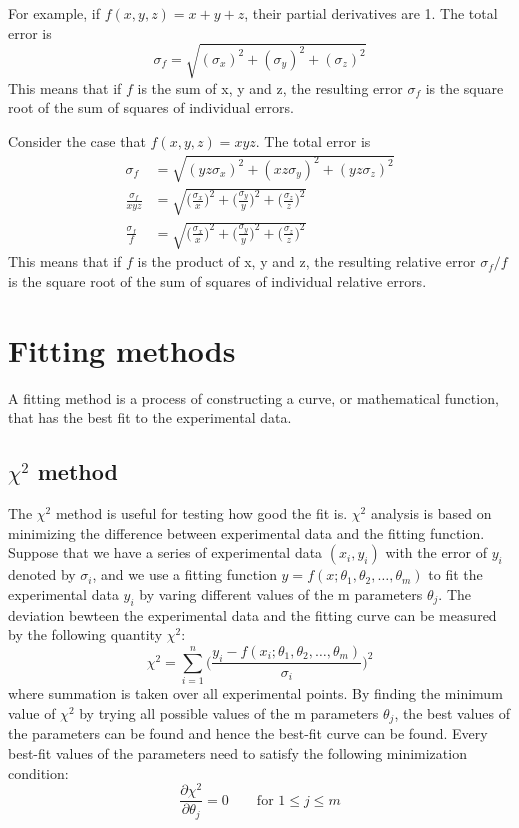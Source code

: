 \documentclass[12pt,a4paper]{report}
\begin{document}
For example, if $f(x,y,z) = x+y+z$, their partial derivatives are 1. The total error is
\begin{equation}
\sigma_{f} = \sqrt{( \sigma_x )^2 + ( \sigma_y )^2+ ( \sigma_z )^2}
\end{equation}
 This means that if $f$ is the sum of x, y and z, the resulting error $\sigma_{f}$ is the square root of the sum of squares of individual errors.
 
Consider the case that $f(x,y,z) = xyz$. The total error is
\begin{align}
\sigma_{f} &= \sqrt{( yz \sigma_x )^2 + ( xz \sigma_y )^2+ ( yz \sigma_z )^2} \\
\frac{ \sigma_{f} }{xyz} &= \sqrt{ \Big( \frac{\sigma_x}{x} \Big)^2 + \Big( \frac{\sigma_y}{y} \Big)^2 + \Big( \frac{\sigma_z}{z} \Big)^2} \\
\frac{ \sigma_{f} }{f} &= \sqrt{ \Big( \frac{\sigma_x}{x} \Big)^2 + \Big( \frac{\sigma_y}{y} \Big)^2 + \Big( \frac{\sigma_z}{z} \Big)^2}
\end{align}
This means that if $f$ is the product of x, y and z, the resulting relative error $\sigma_{f}/f$ is the square root of the sum of squares of individual relative errors.

\section{Fitting methods}
A fitting method is a process of constructing a curve, or mathematical function, that has the best fit to the experimental data.
\subsection{$\chi^2$ method}
The $\chi^2$ method is useful for testing how good the fit is.
$\chi^2$ analysis \cite{stat_2, BAKER1984437, reduced_chi_squared} is based on minimizing the difference between experimental data and the fitting function. Suppose that we have a series of experimental data $(x_i,y_i)$ with the error of $y_i$ denoted by $\sigma_i$, and we use a fitting function $y = f(x;\theta_1,\theta_2,\dots,\theta_m)$ to fit the experimental data $y_i$ by varing different values of the m parameters $\theta_j$. The deviation bewteen the experimental data and the fitting curve can be measured by the following quantity $\chi^2$:
\begin{equation} \label{chi_square_formula}
\chi^2 = \sum_{i = 1}^{n} \Big ( \frac{y_i - f(x_i;\theta_1,\theta_2,\dots,\theta_m)}{\sigma_i} \Big )^2
\end{equation}
where summation is taken over all experimental points.
By finding the minimum value of $\chi^2$ by trying all possible values of the m parameters $\theta_j$, the best values of the parameters can be found and hence the best-fit curve can be found.
Every best-fit values of the parameters need to satisfy the following minimization condition:
\begin{equation} \label{chi_minimisation_condition}
\frac{\partial \chi^2}{\partial \theta_j} = 0 \qquad \text{for } 1 \leq  j \leq m
\end{equation}
\end{document}
